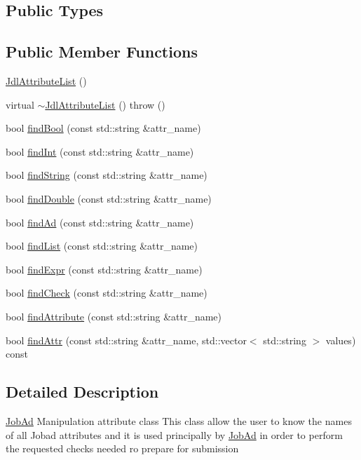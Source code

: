 \subsection*{Public Types}
\subsection*{Public Member Functions}
\begin{CompactItemize}
\item 
\hyperlink{classglite_1_1wms_1_1jdl_1_1JdlAttributeList_a0}{Jdl\-Attribute\-List} ()
\item 
virtual \hyperlink{classglite_1_1wms_1_1jdl_1_1JdlAttributeList_a1}{$\sim$Jdl\-Attribute\-List} ()  throw ()
\item 
bool \hyperlink{classglite_1_1wms_1_1jdl_1_1JdlAttributeList_a2}{find\-Bool} (const std::string \&attr\_\-name)
\item 
bool \hyperlink{classglite_1_1wms_1_1jdl_1_1JdlAttributeList_a3}{find\-Int} (const std::string \&attr\_\-name)
\item 
bool \hyperlink{classglite_1_1wms_1_1jdl_1_1JdlAttributeList_a4}{find\-String} (const std::string \&attr\_\-name)
\item 
bool \hyperlink{classglite_1_1wms_1_1jdl_1_1JdlAttributeList_a5}{find\-Double} (const std::string \&attr\_\-name)
\item 
bool \hyperlink{classglite_1_1wms_1_1jdl_1_1JdlAttributeList_a6}{find\-Ad} (const std::string \&attr\_\-name)
\item 
bool \hyperlink{classglite_1_1wms_1_1jdl_1_1JdlAttributeList_a7}{find\-List} (const std::string \&attr\_\-name)
\item 
bool \hyperlink{classglite_1_1wms_1_1jdl_1_1JdlAttributeList_a8}{find\-Expr} (const std::string \&attr\_\-name)
\item 
bool \hyperlink{classglite_1_1wms_1_1jdl_1_1JdlAttributeList_a9}{find\-Check} (const std::string \&attr\_\-name)
\item 
bool \hyperlink{classglite_1_1wms_1_1jdl_1_1JdlAttributeList_a10}{find\-Attribute} (const std::string \&attr\_\-name)
\item 
bool \hyperlink{classglite_1_1wms_1_1jdl_1_1JdlAttributeList_a11}{find\-Attr} (const std::string \&attr\_\-name, std::vector$<$ std::string $>$ values) const 
\end{CompactItemize}


\subsection{Detailed Description}
\hyperlink{classglite_1_1wms_1_1jdl_1_1JobAd}{Job\-Ad} Manipulation attribute class This class allow the user to know the names of all Jobad attributes and it is used principally by \hyperlink{classglite_1_1wms_1_1jdl_1_1JobAd}{Job\-Ad} in order to perform the requested checks needed ro prepare for submission 




